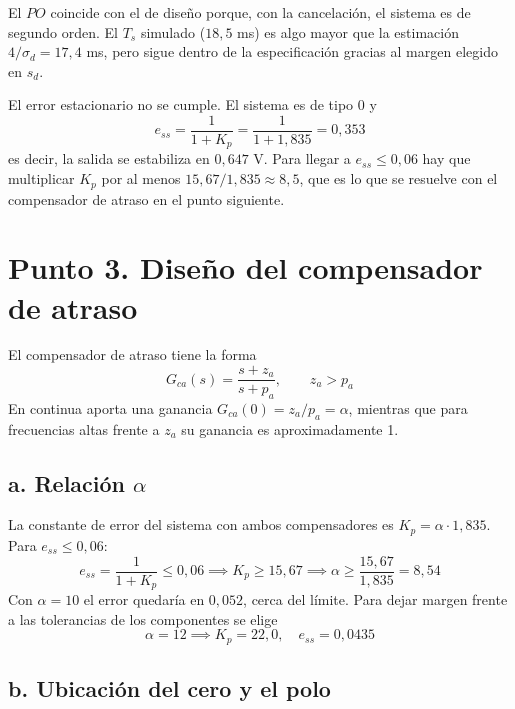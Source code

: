\documentclass[11pt,a4paper]{article}
\begin{document}
El $PO$ coincide con el de diseño porque, con la cancelación, el sistema es de segundo orden. El $T_s$ simulado ($18{,}5$ ms) es algo mayor que la estimación $4/\sigma_d = 17{,}4$ ms, pero sigue dentro de la especificación gracias al margen elegido en $s_d$.

El error estacionario no se cumple. El sistema es de tipo 0 y
\begin{equation}
    e_{ss} = \frac{1}{1 + K_p} = \frac{1}{1 + 1{,}835} = 0{,}353
\end{equation}
es decir, la salida se estabiliza en $0{,}647$ V. Para llegar a $e_{ss} \le 0{,}06$ hay que multiplicar $K_p$ por al menos $15{,}67/1{,}835 \approx 8{,}5$, que es lo que se resuelve con el compensador de atraso en el punto siguiente.

\section*{Punto 3. Diseño del compensador de atraso}

El compensador de atraso tiene la forma
\begin{equation}
    G_{ca}(s) = \frac{s + z_a}{s + p_a}, \qquad z_a > p_a
\end{equation}
En continua aporta una ganancia $G_{ca}(0) = z_a/p_a = \alpha$, mientras que para frecuencias altas frente a $z_a$ su ganancia es aproximadamente 1.

\subsection*{a. Relación $\alpha$}

La constante de error del sistema con ambos compensadores es $K_p = \alpha \cdot 1{,}835$. Para $e_{ss} \le 0{,}06$:
\begin{equation}
    e_{ss} = \frac{1}{1 + K_p} \le 0{,}06 \implies K_p \ge 15{,}67 \implies \alpha \ge \frac{15{,}67}{1{,}835} = 8{,}54
\end{equation}
Con $\alpha = 10$ el error quedaría en $0{,}052$, cerca del límite. Para dejar margen frente a las tolerancias de los componentes se elige
\begin{equation}
    \alpha = 12 \implies K_p = 22{,}0, \quad e_{ss} = 0{,}0435
\end{equation}

\subsection*{b. Ubicación del cero y el polo}
\end{document}
